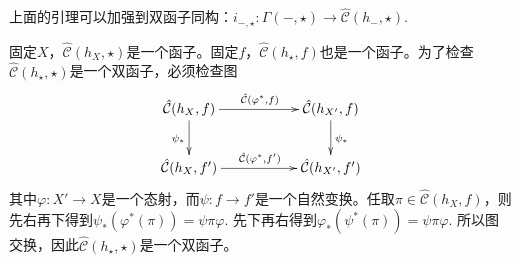 

\begin{pro}[Yoneda引理]
上面的引理可以加强到双函子同构：$i_{-,\star}:\Gamma(-,\star)\to {\hat{\mathcal{C}}}(h_-,\star)$.
\end{pro}

固定$X$，${\hat{\mathcal{C}}}(h_X,\star)$是一个函子。固定$f$，${\hat{\mathcal{C}}}(h_\star,f)$也是一个函子。为了检查${\hat{\mathcal{C}}}(h_\star,\star)$是一个双函子，必须检查图
\[
\begin{xy}
	\xymatrix{
		\hat{\mathcal{C}}(h_{X},f)\ar[rr]^{\hat{\mathcal{C}}(\varphi^*,f)} \ar[d]_{\psi_*}&&\hat{\mathcal{C}}(h_{X'},f) \ar[d]^{\psi_*}\\
		\hat{\mathcal{C}}(h_{X},f')\ar[rr]^{\hat{\mathcal{C}}(\varphi^*,f')}&&\hat{\mathcal{C}}(h_{X'},f')
	}
\end{xy}
\]
其中$\varphi:X'\to X$是一个态射，而$\psi:f\to f'$是一个自然变换。任取$\pi\in \hat{\mathcal{C}}(h_{X},f)$，则先右再下得到$\psi_*(\varphi^*(\pi))=\psi\pi\varphi$. 先下再右得到$\varphi_*(\psi^*(\pi))=\psi\pi\varphi$. 所以图交换，因此${\hat{\mathcal{C}}}(h_\star,\star)$是一个双函子。

